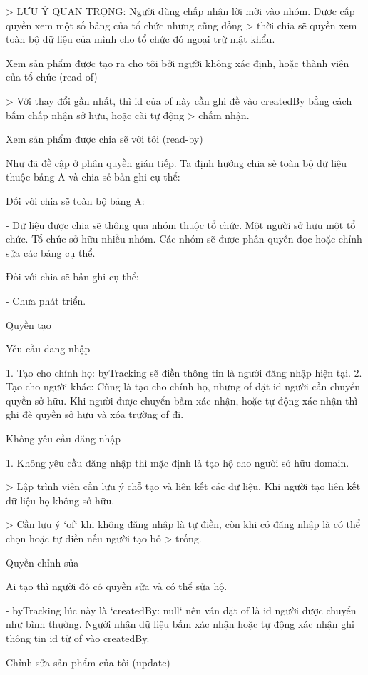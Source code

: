 \documentclass{report}
\begin{document}
> LƯU Ý QUAN TRỌNG: Người dùng chấp nhận lời mời vào nhóm. Được cấp quyền xem một số bảng của tổ chức nhưng cũng đồng
> thời chia sẽ quyền xem toàn bộ dữ liệu của mình cho tổ chức đó ngoại trừ mật khẩu.

Xem sản phẩm được tạo ra cho tôi bởi người không xác định, hoặc thành viên của tổ chức (read-of)



> Với thay đổi gần nhất, thì id của of này cần ghi đề vào createdBy bằng cách bấm chấp nhận sở hữu, hoặc cài tự động
> chấm nhận.

Xem sản phẩm được chia sẽ với tôi (read-by)

Như đã đề cập ở phân quyền gián tiếp. Ta định hướng chia sẻ toàn bộ dữ liệu thuộc bảng A và chia sẻ bản ghi cụ thể:

Đối với chia sẽ toàn bộ bảng A:

-   Dữ liệu được chia sẽ thông qua nhóm thuộc tổ chức. Một người sở hữu một tổ chức. Tổ chức sở hữu nhiều nhóm. Các nhóm
sẽ được phân quyền đọc hoặc chỉnh sửa các bảng cụ thể.

Đối với chia sẽ bản ghi cụ thể:

-   Chưa phát triển.

Quyền tạo

Yều cầu đăng nhập

1. Tạo cho chính họ: byTracking sẽ điền thông tin là người đăng nhập hiện tại.
2. Tạo cho người khác: Cũng là tạo cho chính họ, nhưng of đặt id người cần chuyển quyền sở hữu. Khi người được chuyển
bấm xác nhận, hoặc tự động xác nhận thì ghi đè quyền sở hữu và xóa trường of đi.

Không yêu cầu đăng nhập

1. Không yêu cầu đăng nhập thì mặc định là tạo hộ cho người sở hữu domain.

> Lập trình viên cần lưu ý chỗ tạo và liên kết các dữ liệu. Khi người tạo liên kết dữ liệu họ không sở hữu.

> Cần lưu ý `of` khi không đăng nhập là tự điền, còn khi có đăng nhập là có thể chọn hoặc tự điền nếu người tạo bỏ
> trống.

Quyền chỉnh sửa

Ai tạo thì người đó có quyền sửa và có thể sửa hộ.

-   byTracking lúc này là `createdBy: null` nên vẫn đặt of là id người được chuyển như bình thường. Người nhận dữ liệu
bấm xác nhận hoặc tự động xác nhận ghi thông tin id từ of vào createdBy.

Chỉnh sửa sản phẩm của tôi (update)
\end{document}

